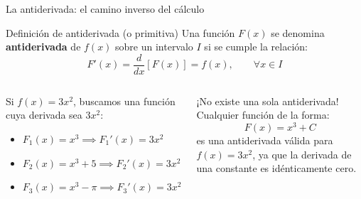 \documentclass[aspectratio=169,11pt]{beamer}
\begin{document}
\begin{frame}{La antiderivada: el camino inverso del cálculo}
\small
\begin{block}{Definición de antiderivada (o primitiva)}
Una función $F(x)$ se denomina \textbf{antiderivada} de $f(x)$ sobre un intervalo $I$ si se cumple la relación:
\[
F'(x) = \frac{d}{dx}[F(x)] = f(x), \qquad \forall x \in I
\]
\end{block}
\vspace{0.06cm}
\begin{columns}[T,onlytextwidth]
\begin{examplebox}[title=Ejemplo de reversión directa]
\footnotesize
Si $f(x) = 3x^2$, buscamos una función cuya derivada sea $3x^2$:
\begin{itemize}[itemsep=1.5pt]
  \item $F_1(x) = x^3 \implies F_1'(x) = 3x^2$ \checkmark
  \item $F_2(x) = x^3 + 5 \implies F_2'(x) = 3x^2$ \checkmark
  \item $F_3(x) = x^3 - \pi \implies F_3'(x) = 3x^2$ \checkmark
\end{itemize}
\end{examplebox}
\begin{warnbox}[title=Observación clave]
\footnotesize
¡No existe una sola antiderivada! Cualquier función de la forma:
\[
F(x) = x^3 + C
\]
es una antiderivada válida para $f(x) = 3x^2$, ya que la derivada de una constante es idénticamente cero.
\end{warnbox}
\end{columns}
\end{frame}
\end{document}
